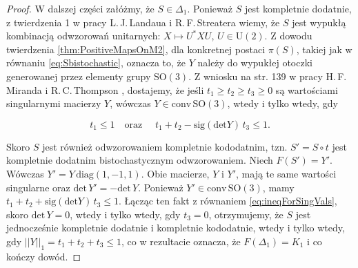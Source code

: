 {\begin{proof}
W dalszej części załóżmy, że $S \in \Delta_{1}$.
Ponieważ $S$ jest kompletnie dodatnie,
z twierdzenia 1 w pracy L.\,J.\,Landaua i R.\,F.\,Streatera
\cite{landau1993birkhoff} wiemy, że
$S$ jest wypukłą kombinacją odwzorowań unitarnych:
$X \mapsto U^{*} X U$, $U \in \text{U}(2)$.
Z dowodu twierdzenia \ref{thm:PositiveMapsOnM2},
dla konkretnej postaci $\pi(S)$, takiej jak w równaniu \eqref{eq:Sbistochastic},
oznacza to, że $Y$ należy do wypukłej otoczki generowanej przez elementy grupy $\text{SO}(3)$.
Z  wniosku na str. 139 w pracy H.\,F.\,Miranda i R.\,C.\,Thompson
\cite{miranda1994group},
dostajemy, że jeśli $t_{1} \geq t_{2} \geq t_{3} \geq 0$
są wartościami singularnymi macierzy $Y$,
wówczas $Y \in \text{conv} \, \text{SO}(3)$,
wtedy i tylko wtedy, gdy
\begin{linenomath*}
 \begin{equation}
\label{eq:ineqForSingVals}
t_{1} \leq 1
\quad \text{oraz    } \quad
t_{1} + t_{2} - \text{sig} (\text{det} Y) \, t_{3} \leq 1.
 \end{equation}
\end{linenomath*}
Skoro $S$ jest również odwzorowaniem kompletnie kododatnim, tzn.
$S' = S \circ t$ jest kompletnie dodatnim bistochastycznym odwzorowaniem.
Niech $F(S') = Y'$.
Wówczas $Y' = Y \, \text{diag} (1,-1,1)$.
Obie macierze, $Y$ i $Y'$, mają te same wartości singularne oraz
$\text{det} \, Y' = - \text{det} \, Y$.
Ponieważ $Y' \in  \text{conv} \, \text{SO}(3)$, mamy
$t_{1} + t_{2} + \text{sig} (\text{det} Y) \, t_{3} \leq 1$.
Łącząc ten fakt z równaniem \eqref{eq:ineqForSingVals},
skoro $\text{det} \, Y = 0$, wtedy i tylko wtedy, gdy  $t_{3} = 0$,
otrzymujemy, że $S$ jest jednocześnie kompletnie dodatnie i kompletnie kododatnie,
wtedy i tylko wtedy, gdy
$||Y||_{1} = t_{1} + t_{2} + t_{3} \leq 1$,
co w rezultacie oznacza, że $F(\Delta_{1}) = K_{1}$
i co kończy dowód.
\end{proof}

}
